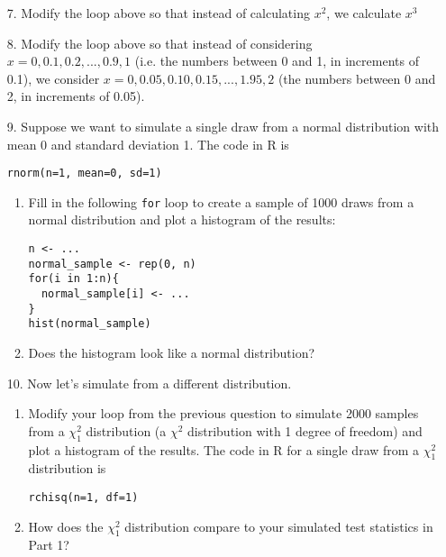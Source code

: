 \documentclass[11pt]{article}
\begin{document}
\begin{enumerate}
\item[7.] Modify the loop above so that instead of calculating $x^2$, we calculate $x^3$

\item[8.] Modify the loop above so that instead of considering $x = 0, 0.1, 0.2, ..., 0.9, 1$ (i.e. the numbers between 0 and 1, in increments of 0.1), we consider $x = 0, 0.05, 0.10, 0.15, ..., 1.95, 2$ (the numbers between 0 and 2, in increments of 0.05).

\item[9.] Suppose we want to simulate a single draw from a normal distribution with mean 0 and standard deviation 1. The code in R is
\begin{verbatim}
rnorm(n=1, mean=0, sd=1)
\end{verbatim}
\begin{enumerate}
\item Fill in the following \verb;for; loop to create a sample of 1000 draws from a normal distribution and plot a histogram of the results:
\begin{verbatim}
n <- ...
normal_sample <- rep(0, n)
for(i in 1:n){
  normal_sample[i] <- ...
}
hist(normal_sample)
\end{verbatim}

\item Does the histogram look like a normal distribution?
\end{enumerate}

\item[10.] Now let's simulate from a different distribution.

\begin{enumerate}
\item Modify your loop from the previous question to simulate 2000 samples from a $\chi^2_1$ distribution (a $\chi^2$ distribution with 1 degree of freedom) and plot a histogram of the results. The code in R for a single draw from a $\chi^2_1$ distribution is
\begin{verbatim}
rchisq(n=1, df=1)
\end{verbatim}

\item How does the $\chi^2_1$ distribution compare to your simulated test statistics in Part 1?
\end{enumerate}


\end{enumerate}

\vspace{1cm}
\end{document}
